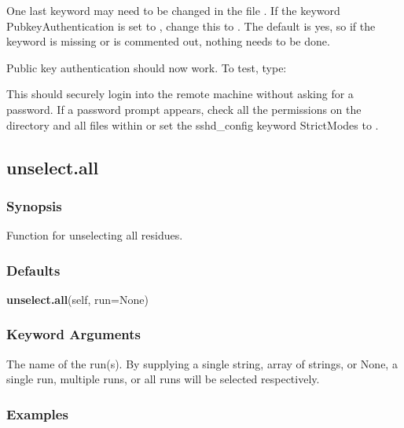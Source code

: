 One last keyword may need to be changed in the file 
.  If the keyword
PubkeyAuthentication is set to 
, change this to 
.  The default is yes, so if the
keyword is missing or is commented out, nothing needs to be done.

Public key authentication should now work.  To test, type:



This should securely login into the remote machine without asking for a password.  If a
password prompt appears, check all the permissions on the directory 
 and all files
within or set the sshd\_config keyword StrictModes to 
.






\newpage

\subsection{unselect.all}


\subsubsection{Synopsis}

Function for unselecting all residues.

\subsubsection{Defaults}

\textsf{\textbf{unselect.all}(self, run=None)}


\subsubsection{Keyword Arguments}


  The name of the run(s).  By supplying a single string, array of strings, or None, a single run, multiple runs, or all runs will be selected respectively.

\subsubsection{Examples}

